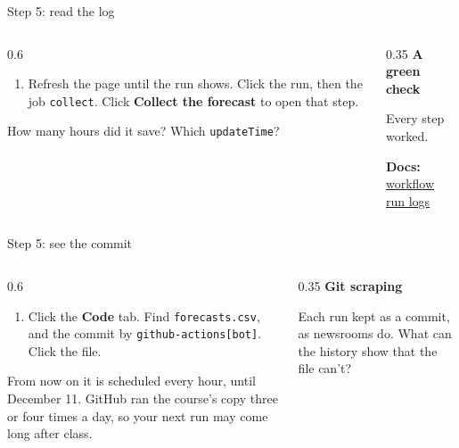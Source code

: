 \documentclass[9pt,aspectratio=169]{beamer}
\begin{document}
\begin{frame}{Step 5: read the log}
    \begin{columns}[T]
        \begin{column}{0.6\textwidth}
            \begin{enumerate}\small\setcounter{enumi}{6}
                \item Refresh the page until the run shows. Click the run, then the job \texttt{collect}. Click \textbf{Collect the forecast} to open that step.
            \end{enumerate}
            \medskip
            How many hours did it save? Which \texttt{updateTime}?
        \end{column}
        \begin{column}{0.35\textwidth}
            \textbf{A green check}\\[2pt]
            {\footnotesize Every step worked.\par}
            \medskip
            {\scriptsize\textbf{Docs:} \href{https://docs.github.com/en/actions/how-tos/monitor-workflows/use-workflow-run-logs}{workflow run logs}\par}
        \end{column}
    \end{columns}
\end{frame}

\begin{frame}{Step 5: see the commit}
    \begin{columns}[T]
        \begin{column}{0.6\textwidth}
            \begin{enumerate}\small\setcounter{enumi}{7}
                \item Click the \textbf{Code} tab. Find \texttt{forecasts.csv}, and the commit by \texttt{github-actions[bot]}. Click the file.
            \end{enumerate}
            \medskip
            From now on it is scheduled every hour, until December 11. GitHub ran the course's copy three or four times a day, so your next run may come long after class.
        \end{column}
        \begin{column}{0.35\textwidth}
            \textbf{Git scraping}\\[2pt]
            {\footnotesize Each run kept as a commit, as newsrooms do. What can the history show that the file can't?\par}
        \end{column}
    \end{columns}
\end{frame}
\end{document}

